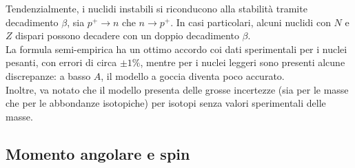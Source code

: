 Tendenzialmente, i nuclidi instabili si riconducono alla stabilità tramite decadimento $ \beta $, sia $ p^+ \rightarrow n $ che $ n \rightarrow p^+ $. In casi particolari, alcuni nuclidi con $ N $ e $ Z $ dispari possono decadere con un doppio decadimento $ \beta $.\\
La formula semi-empirica ha un ottimo accordo coi dati sperimentali per i nuclei pesanti, con errori di circa $ \pm 1\% $, mentre per i nuclei leggeri sono presenti alcune discrepanze: a basso $ A $, il modello a goccia diventa poco accurato.\\
Inoltre, va notato che il modello presenta delle grosse incertezze (sia per le masse che per le abbondanze isotopiche) per isotopi senza valori sperimentali delle masse.

\subsection{Momento angolare e spin}

